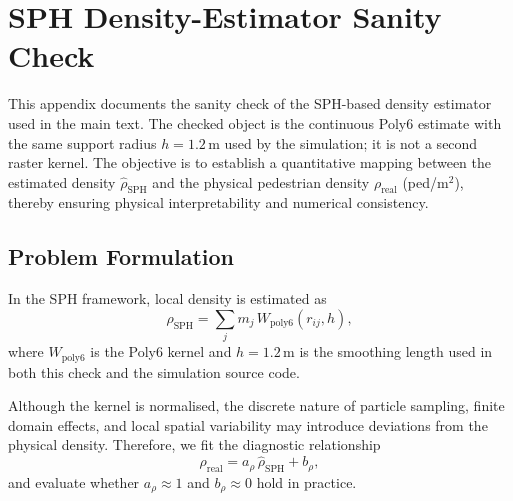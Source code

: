 \documentclass[preprint,12pt]{elsarticle}
\providecommand{\FloatBarrier}{}
\let\origsection\section
\renewcommand{\section}{\FloatBarrier\origsection}
\let\origsubsection\subsection
\renewcommand{\subsection}{\FloatBarrier\origsubsection}
\begin{document}
\FloatBarrier   %
\newpage  %
\appendix  %



\section{SPH Density-Estimator Sanity Check}
\label{app:sph_density}

This appendix documents the sanity check of the SPH-based density estimator
used in the main text. The checked object is the continuous Poly6 estimate
with the same support radius $h=1.2$\,m used by the simulation; it is not a
second raster kernel. The objective is to establish a quantitative mapping
between the estimated density $\hat{\rho}_{\mathrm{SPH}}$ and the physical
pedestrian density $\rho_{\mathrm{real}}$ (ped/m$^2$), thereby ensuring
physical interpretability and numerical consistency.


\subsection{Problem Formulation}
\label{app:calib_problem}

In the SPH framework, local density is estimated as
\begin{equation}
\hat{\rho}_{\mathrm{SPH}}
=
\sum_j m_j \, W_{\mathrm{poly6}}(r_{ij}, h),
\end{equation}
where $W_{\mathrm{poly6}}$ is the Poly6 kernel and $h=1.2$\,m is the
smoothing length used in both this check and the simulation source code.

Although the kernel is normalised, the discrete nature of particle sampling,
finite domain effects, and local spatial variability may introduce deviations
from the physical density. Therefore, we fit the diagnostic relationship
\begin{equation}
\rho_{\mathrm{real}}
=
a_\rho \, \hat{\rho}_{\mathrm{SPH}} + b_\rho,
\label{eq:calib_relation_app}
\end{equation}
and evaluate whether $a_\rho \approx 1$ and $b_\rho \approx 0$ hold in practice.
\end{document}
